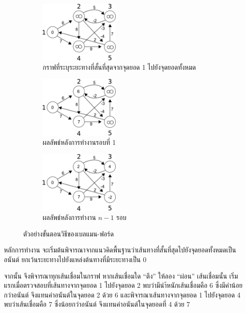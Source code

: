 \begin{figure}[h!]
	\centering
    \begin{subfigure}{.5\textwidth}
    	\centering
    	\includegraphics[width=4cm]{images/bellman-ford-1}
    	\caption{กราฟที่ระบุระยะทางที่สั้นที่สุดจากจุดยอด 1 ไปยังจุดยอดทั้งหมด}
    	\label{fig:bellman_ford_1}
    \end{subfigure}%
    \begin{subfigure}{.5\textwidth}
    	\centering
    	\includegraphics[width=4cm]{images/bellman-ford-2}
    	\caption{ผลลัพธ์หลังการทำงานรอบที่ 1}
    	\label{fig:bellman_ford_2}
    \end{subfigure}
     \begin{subfigure}{.5\textwidth}
    	\centering
    	\includegraphics[width=4cm]{images/bellman-ford-final}
    	\caption{ผลลัพธ์หลังการทำงาน $n-1$ รอบ}
    	\label{fig:bellman_ford_2}
    \end{subfigure}
    \caption{ตัวอย่างขั้นตอนวิธีของเบลแมน-ฟอร์ด}
    \label{fig:bellman_ford_example}
\end{figure}

หลักการทำงาน จะเริ่มต้นพิจารณาจากแนวคิดพื้นฐานว่าเส้นทางที่สั้นที่สุดไปยังจุดยอดทั้งหมดเป็นอนันต์ ยกเว้นระยะทางไปยังแหล่งต้นทางที่มีระยะทางเป็น 0

จากนั้น จึงพิจารณาทุกเส้นเชื่อมในกราฟ หากเส้นเชื่อมใด ``ตึง'' ให้ลอง ``ผ่อน'' เส้นเชื่อมนั้น เริ่มแรกเมื่อตรวจสอบที่เส้นทางจากจุดยอด 1 ไปยังจุดยอด 2 พบว่ามีนำ้หนักเส้นเชื่อมคือ 6 ซึ่งมีค่าน้อยกว่าอนันต์ จึงแทนค่าอนันต์ในจุดยอด 2 ด้วย 6 และพิจารณาเส้นทางจากจุดยอด 1 ไปยังจุดยอด 4 พบว่าเส้นเชื่อมคือ 7 ซึ่งน้อยกว่าอนันต์ จึงแทนค่าอนันต์ในจุดยอดที่ 4 ด้วย 7

